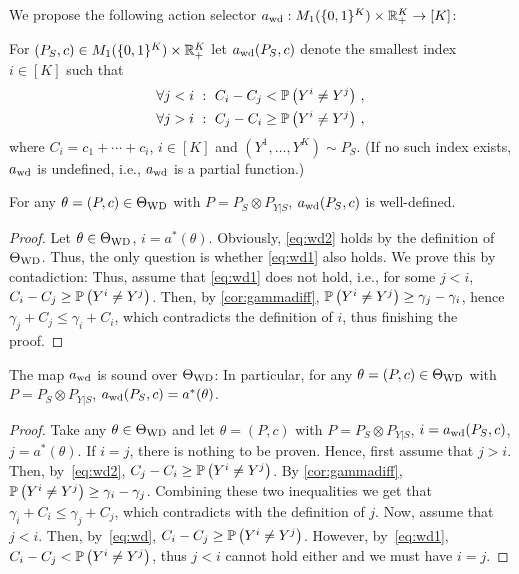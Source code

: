 We propose the following action selector $a_{\mathrm{wd}}: M_1(\{0,1\}^K) \times \mathbb{R}_+^K \to [K]$:
\begin{defi}\label{def:awd}
For $(P_S,c) \in M_1(\{0,1\}^K) \times \mathbb{R}_+^K$ let $a_{\mathrm{wd}}(P_S,c)$ denote the smallest index $i\in [K]$ such that
\begin{subequations}
\begin{align}
\forall j<i \,\,:\,\, C_i - C_j < \mathbb{P}\left( Y^i \ne Y^j \right)\,, \label{eq:wd1}\\ 
\forall j>i \,\,:\,\, C_j - C_i \ge \mathbb{P}\left( Y^i \ne Y^j \right)\,, \label{eq:wd2}
\end{align}
\end{subequations}
where $C_i = c_1+\cdots + c_i$, $i\in [K]$ and $(Y^1,\dots,Y^K) \sim P_S$.
(If no such index exists, $a_{\mathrm{wd}}$ is undefined, i.e., $a_{\mathrm{wd}}$ is a partial function.)
\end{defi}
\begin{prop}
\label{prop:awdwelldef}
For any $\theta = (P,c)\in \Theta_{\mathrm{WD}}$ with $P = P_S\otimes P_{Y|S}$, $a_{\mathrm{wd}}(P_S,c)$ is well-defined.
\end{prop}
\begin{proof}
Let $\theta\in \Theta_{\mathrm{WD}}$, $i = a^*(\theta)$. Obviously, \eqref{eq:wd2} holds by the definition of $\Theta_{\mathrm{WD}}$.
Thus, the only question is whether \eqref{eq:wd1} also holds.
We prove this by contadiction:
Thus, assume that \eqref{eq:wd1} does not hold, i.e., for some $j<i$, $C_i-C_j \ge \mathbb{P}\left(Y^i \ne Y^j\right)$. Then, by \cref{cor:gammadiff}, $\mathbb{P}\left( Y^i \ne Y^j\right) \ge \gamma_j - \gamma_i$, hence $\gamma_j + C_j \le \gamma_i + C_i$, which contradicts the definition of $i$, thus finishing the proof.
\end{proof}
\begin{prop}
\label{prop:awdsound}
The map $a_{\mathrm{wd}}$ is sound over $\Theta_{\mathrm{WD}}$: In particular, for any
$\theta = (P,c)\in \Theta_{\mathrm{WD}}$ with $P = P_S\otimes P_{Y|S}$, $a_{\mathrm{wd}}(P_S,c)= a^*(\theta)$.
\end{prop}
\begin{proof}
Take any $\theta\in \Theta_{\mathrm{WD}}$ and let $\theta = (P,c)$ with $P = P_S\otimes P_{Y|S}$, $i = a_{\mathrm{wd}}(P_S,c)$, $j = a^*(\theta)$.
If $i=j$, there is nothing to be proven. Hence, first assume that $j>i$. Then, by~\eqref{eq:wd2}, $C_j - C_i \ge \mathbb{P}\left(Y^i \ne Y^j\right)$.
By \cref{cor:gammadiff}, $\mathbb{P}\left(Y^i \ne Y^j \right) \ge \gamma_i - \gamma_j$. Combining these two inequalities we get that
$\gamma_i + C_i \le \gamma_j + C_j$, which contradicts with the definition of $j$.
Now, assume that $j<i$. Then, by~\eqref{eq:wd}, $C_i - C_j \ge \mathbb{P}\left(Y^i \ne Y^j\right)$.
However, by~\eqref{eq:wd1}, $C_i -C_j < \mathbb{P}\left(Y^i \ne Y^j\right)$, thus $j<i$ cannot hold either and we must have $i=j$.
\end{proof}
